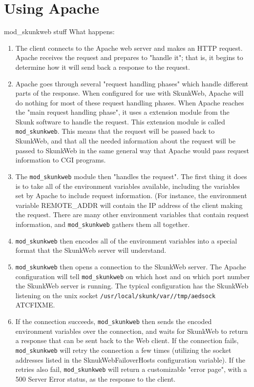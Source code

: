 \documentclass[titlepage]{manual}
\begin{document}
\chapter{Using Apache}
  mod_skunkweb stuff
  What happens:
\begin{enumerate}
\item The client connects to the Apache web server and makes an HTTP
request. Apache receives the request and prepares to "handle it"; that
is, it begins to determine how it will send back a response to the
request.

\item Apache goes through several "request handling phases" which
handle different parts of the response. When configured for use with
SkunkWeb, Apache will do nothing for most of these request handling
phases.  When Apache reaches the "main request handling phase", it
uses a extension module from the Skunk software to handle the request.
This extension module is called \texttt{mod\_skunkweb}.  This means
that the request will be passed back to SkunkWeb, and that all the
needed information about the request will be passed to SkunkWeb in the
same general way that Apache would pass request information to CGI
programs.

\item The \texttt{mod\_skunkweb} module then "handles the
request". The first thing it does is to take all of the environment
variables available, including the variables set by Apache to include
request information. (For instance, the environment variable
REMOTE\_ADDR will contain the IP address of the client making the
request.  There are many other environment variables that contain
request information, and \texttt{mod\_skunkweb} gathers them all
together.

\item \texttt{mod\_skunkweb} then encodes all of the environment
variables into a special format that the SkunkWeb server will
understand.

\item \texttt{mod\_skunkweb} then opens a connection to the SkunkWeb
server. The Apache configuration will tell \texttt{mod\_skunkweb} on
which host and on which port number the SkunkWeb server is
running. The typical configuration has the SkunkWeb listening on the
unix socket \texttt{/usr/local/skunk/var//tmp/aedsock}  ATCFIXME.

\item If the connection succeeds, \texttt{mod\_skunkweb} then sends
the encoded environment variables over the connection, and waits for
SkunkWeb to return a response that can be sent back to the Web
client. If the connection fails, \texttt{mod\_skunkweb} will retry the
connection a few times (utilizing the socket addresses listed in the
SknukWebFailoverHosts configuration variable). If the retries also
fail, \texttt{mod\_skunkweb} will return a customizable "error page",
with a 500 Server Error status, as the response to the client.


\end{enumerate}
\end{document}
